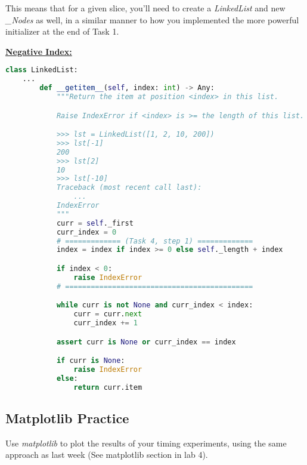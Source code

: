 \documentclass[12pt]{article}
\begin{document}
\bigskip

\noindent This means that for a given slice, you’ll need to create a \textit{LinkedList} and new
\textit{\_Nodes} as well, in a similar manner to how you implemented the more
powerful initializer at the end of Task 1.

\bigskip

\begin{mdframed}

\underline{\textbf{Negative Index:}}

\begin{lstlisting}[language=python]
    class LinkedList:
    ...
        def __getitem__(self, index: int) -> Any:
            """Return the item at position <index> in this list.

            Raise IndexError if <index> is >= the length of this list.

            >>> lst = LinkedList([1, 2, 10, 200])
            >>> lst[-1]
            200
            >>> lst[2]
            10
            >>> lst[-10]
            Traceback (most recent call last):
                ...
            IndexError
            """
            curr = self._first
            curr_index = 0
            # ============= (Task 4, step 1) =============
            index = index if index >= 0 else self._length + index

            if index < 0:
                raise IndexError
            # ============================================

            while curr is not None and curr_index < index:
                curr = curr.next
                curr_index += 1

            assert curr is None or curr_index == index

            if curr is None:
                raise IndexError
            else:
                return curr.item

\end{lstlisting}
\end{mdframed}


\subsection*{Matplotlib Practice}
Use \textit{matplotlib} to plot the results of your timing experiments, using the same
approach as last week (See matplotlib section in lab 4).
\end{document}
